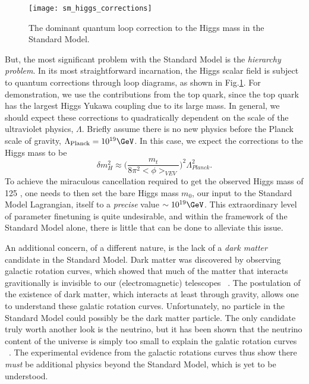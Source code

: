 \begin{figure}
\caption{The dominant quantum loop correction to the Higgs mass in the Standard Model.} \label{fig:sm_higgs_corrections}
\texttt{[image: sm\_higgs\_corrections]}
\end{figure}
But, the most significant problem with the Standard Model is the \textit{hierarchy problem}.
In its most straightforward incarnation, the Higgs scalar field is subject to quantum corrections through loop diagrams, as shown in Fig.\ref{fig:sm_higgs_corrections}.
For demonstration, we use the contributions from the top quark, since the top quark has the largest Higgs Yukawa coupling due to its large mass.
In general, we should expect these corrections to quadratically dependent on the scale of the ultraviolet physics, $\Lambda$.
Briefly assume there is no new physics before the Planck scale of gravity, $\Lambda_{\text{Planck}} = 10^{19} \GeV$.
In this case, we expect the corrections to the Higgs mass to be
\begin{equation}
\delta m^2_H \approx \Big( \frac{m_t}{8\pi^2 <\phi>_{VEV}} \Big)^2 \Lambda_{Planck}^2.
\end{equation}
To achieve the miraculous cancellation required to get the observed Higgs mass of 125 \GeV, one needs to then set the bare Higgs mass $m_0$, our input to the Standard Model Lagrangian, itself to a \textit{precise} value $\order 10^{19} \GeV$.
This extraordinary level of parameter finetuning is quite undesirable, and within the framework of the Standard Model alone, there is little that can be done to alleviate this issue.

An additional concern, of a different nature, is the lack of a \textit{dark matter} candidate in the Standard Model.
Dark matter was discovered by observing galactic rotation curves, which showed that much of the matter that interacts gravitionally is invisible to our (electromagnetic) telescopes ~\cite{Rubin:1970zza, Roberts:1970zza, Rubin:1980zd, Rubin:1985ze, Bosma:1981zz, Persic:1995ru, darkMatterPrimer}.
The postulation of the existence of dark matter, which interacts at least through gravity, allows one to understand these galatic rotation curves.
Unfortunately, no particle in the Standard Model could possibly be the dark matter particle.
The only candidate truly worth another look is the neutrino, but it has been shown that the neutrino content of the universe is simply too small to explain the galatic rotation curves ~\cite{Quigg:2008ab, darkMatterPrimer}.
The experimental evidence from the galactic rotations curves thus show there \textit{must} be additional physics beyond the Standard Model, which is yet to be understood.

